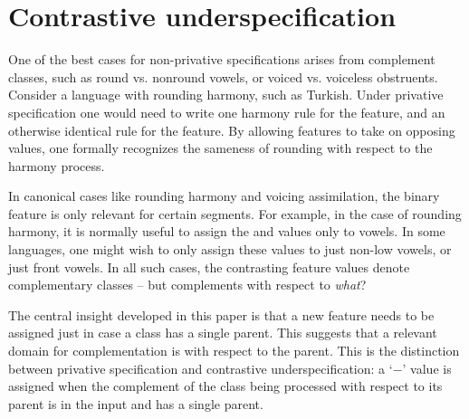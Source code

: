 \documentclass[11pt, oneside]{article}   	%
\begin{document}
\FloatBarrier
\section{Contrastive underspecification}
\label{sec:contrastiveunder}

One of the best cases for non-privative specifications arises from complement classes, such as round vs. nonround vowels, or voiced vs. voiceless obstruents. Consider a language with rounding harmony, such as Turkish. Under privative specification one would need to write one harmony rule for the  feature, and an otherwise identical rule for the  feature. By allowing features to take on opposing values, one formally recognizes the sameness of rounding with respect to the harmony process.

In canonical cases like rounding harmony and voicing assimilation, the binary feature is only relevant for certain segments. For example, in the case of rounding harmony, it is normally useful to assign the  and  values only to vowels. In some languages, one might wish to only assign these values to just non-low vowels, or just front vowels. In all such cases, the contrasting feature values denote complementary classes -- but complements with respect to \textit{what}?

The central insight developed in this paper is that a new feature needs to be assigned just in case a class has a single parent. This suggests that a relevant domain for complementation is with respect to the parent. This is the distinction between privative specification and contrastive underspecification: a `$-$' value is assigned when the complement of the class being processed with respect to its parent is in the input and has a single parent.
\end{document}
